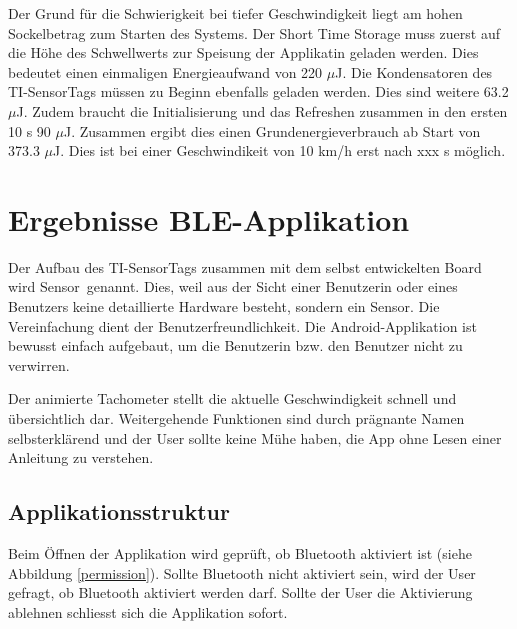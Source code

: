 Der Grund für die Schwierigkeit bei tiefer Geschwindigkeit liegt am hohen Sockelbetrag zum Starten des Systems. Der Short Time Storage muss zuerst auf die Höhe des Schwellwerts zur Speisung der Applikatin geladen werden. Dies bedeutet einen einmaligen Energieaufwand von 220 $\mu$J. Die Kondensatoren des TI-SensorTags müssen zu Beginn ebenfalls geladen werden. Dies sind weitere 63.2 $\mu$J. Zudem braucht die Initialisierung und das Refreshen zusammen in den ersten 10 s 90 $\mu$J. Zusammen ergibt dies einen Grundenergieverbrauch ab Start von 373.3 $\mu$J. Dies ist bei einer Geschwindikeit von 10 km/h erst nach xxx s möglich.





\section{Ergebnisse BLE-Applikation}

Der Aufbau des TI-SensorTags zusammen mit dem selbst entwickelten Board wird \glqq Sensor\grqq\thinspace\ genannt. Dies, weil aus der Sicht einer Benutzerin oder eines Benutzers keine detaillierte Hardware besteht, sondern \glqq ein Sensor\grqq. Die Vereinfachung dient der Benutzerfreundlichkeit. Die Android-Applikation ist bewusst einfach aufgebaut, um die Benutzerin bzw. den Benutzer nicht zu verwirren. 

Der animierte Tachometer stellt die aktuelle Geschwindigkeit schnell und übersichtlich dar. Weitergehende Funktionen sind durch prägnante Namen selbsterklärend und der User sollte keine Mühe haben, die App ohne Lesen einer Anleitung zu verstehen.

\subsection{Applikationsstruktur}

Beim Öffnen der Applikation wird geprüft, ob Bluetooth aktiviert ist (siehe Abbildung \ref{permission}). Sollte Bluetooth nicht aktiviert sein, wird der User gefragt, ob Bluetooth aktiviert werden darf. Sollte der User die Aktivierung ablehnen schliesst sich die Applikation sofort.

